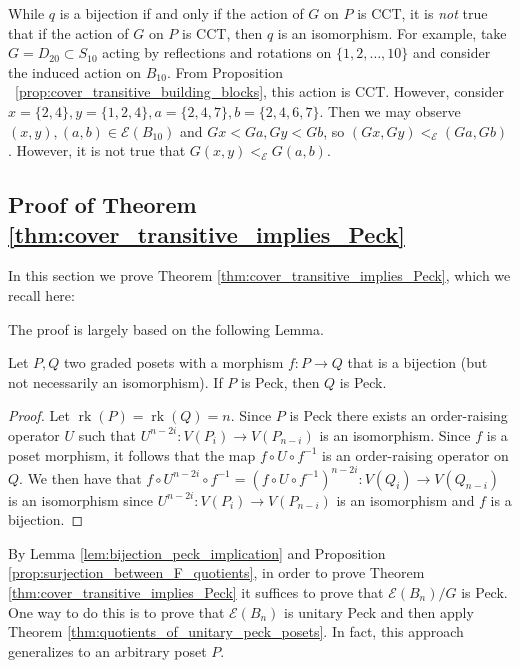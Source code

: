 \documentclass[smallextended]{svjour3}       %
\numberwithin{equation}{section}
\newcommand\ssec{\subsection}
\newcommand\rk{\operatorname{rk}}
\begin{document}
\begin{remark}
While $q$ is a bijection if and only if the action of $G$ on $P$ is CCT, it is {\it not} true that if the action of $G$ on $P$ is CCT, then $q$ is an isomorphism.  For example, take $G=D_{20} \subset S_{10}$ acting by reflections and rotations on $\{1,2,\ldots,10\}$ and consider the induced action on $B_{10}$. From Proposition ~\ref{prop:cover_transitive_building_blocks}, this action is CCT. However, consider $x = \{2,4\},y = \{1,2,4\},a = \{2,4,7\},b = \{2,4,6,7\}$. Then we may observe $(x , y),(a, b) \in \mathcal E(B_{10})$ and $Gx < Ga, Gy < Gb$, so $(Gx, Gy) <_{\mathcal E} (Ga, Gb)$. However, it is not true that $G(x, y)<_{\mathcal E} G(a,b)$.
\end{remark}

\ssec{Proof of Theorem \ref{thm:cover_transitive_implies_Peck}}\label{ssec:proof_of_cover_transitive_implies_Peck}

In this section we prove Theorem \ref{thm:cover_transitive_implies_Peck}, which we recall here:

\cctpeck*

The proof is largely based on the following Lemma.

\begin{lemma}\label{lem:bijection_peck_implication}
Let $P,Q$ two graded posets with a morphism $f\colon P\rightarrow Q$ that is a bijection (but not necessarily an isomorphism). If $P$ is Peck, then $Q$ is Peck.
\end{lemma}
\begin{proof}
Let $\rk(P) = \rk(Q) = n$.  Since $P$ is Peck there exists an order-raising operator $U$ such that $U^{n-2i}\colon V(P_i)\rightarrow V(P_{n-i})$ is an isomorphism.  Since $f$ is a poset morphism, it follows that the map $f\circ U\circ f^{-1}$ is an order-raising operator on $Q$.  We then have that $f\circ U^{n-2i}\circ f^{-1} = \left(f\circ U\circ f^{-1}\right)^{n-2i}\colon V(Q_i)\rightarrow V(Q_{n-i})$ is an isomorphism since $U^{n-2i}\colon V(P_i)\rightarrow V(P_{n-i})$ is an isomorphism and $f$ is a bijection.

\end{proof}

By Lemma \ref{lem:bijection_peck_implication} and Proposition \ref{prop:surjection_between_F_quotients}, in order to prove Theorem \ref{thm:cover_transitive_implies_Peck} it suffices to prove that $\mathcal E(B_n)/G$ is Peck.  One way to do this is to prove that $\mathcal E(B_n)$ is unitary Peck and then apply Theorem \ref{thm:quotients_of_unitary_peck_posets}.  In fact, this approach generalizes to an arbitrary poset $P$.
\end{document}
